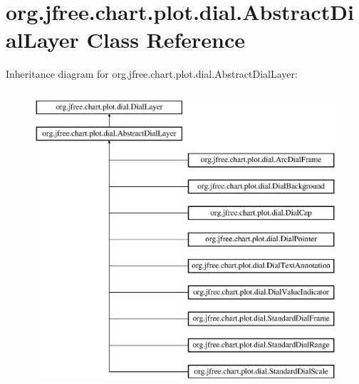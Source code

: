 \hypertarget{classorg_1_1jfree_1_1chart_1_1plot_1_1dial_1_1_abstract_dial_layer}{}\section{org.\+jfree.\+chart.\+plot.\+dial.\+Abstract\+Dial\+Layer Class Reference}
\label{classorg_1_1jfree_1_1chart_1_1plot_1_1dial_1_1_abstract_dial_layer}
Inheritance diagram for org.\+jfree.\+chart.\+plot.\+dial.\+Abstract\+Dial\+Layer\+:\begin{figure}[H]
\begin{center}
\leavevmode
\includegraphics[height=11.000000cm]{classorg_1_1jfree_1_1chart_1_1plot_1_1dial_1_1_abstract_dial_layer}
\end{center}
\end{figure}
